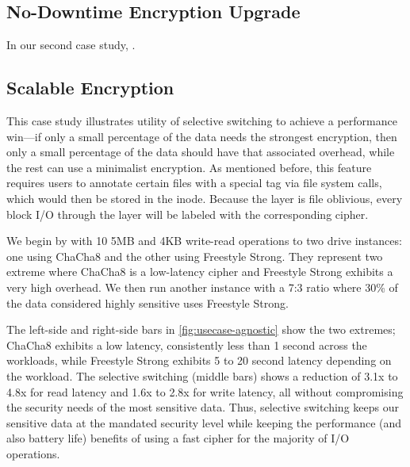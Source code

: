 \subsection{No-Downtime Encryption Upgrade}\label{subsec:usecase-upgrade}

In our second case study, .


\subsection{Scalable Encryption}\label{subsec:usecase-agnostic}

This case study illustrates utility of selective switching to achieve a
performance win---if only a small percentage of the data needs the strongest
encryption, then only a small percentage of the data should have that associated
overhead, while the rest can use a minimalist encryption. As mentioned before,
this feature requires users to annotate certain files with a special tag via
file system calls, which would then be stored in the inode. Because the \sys
layer is file oblivious, every block I/O through the \sys layer will be labeled
with the corresponding cipher.

We begin by with 10 5MB and 4KB write-read operations to two \sys drive
instances: one using ChaCha8 and the other using Freestyle Strong. They
represent two extreme where ChaCha8 is a low-latency cipher and Freestyle Strong
exhibits a very high overhead. We then run another \sys instance with a 7:3
ratio where 30\% of the data considered highly sensitive uses Freestyle Strong.



The left-side and right-side bars in \cref{fig:usecase-agnostic} show the two
extremes; ChaCha8 exhibits a low latency, consistently less than 1 second across
the workloads, while Freestyle Strong exhibits 5 to 20 second latency depending
on the workload. The selective switching (middle bars) shows a reduction of 3.1x
to 4.8x for read latency and 1.6x to 2.8x for write latency, all without
compromising the security needs of the most sensitive data. Thus, selective
switching keeps our sensitive data at the mandated security level while keeping
the performance (and also battery life) benefits of using a fast cipher for the
majority of I/O operations.
